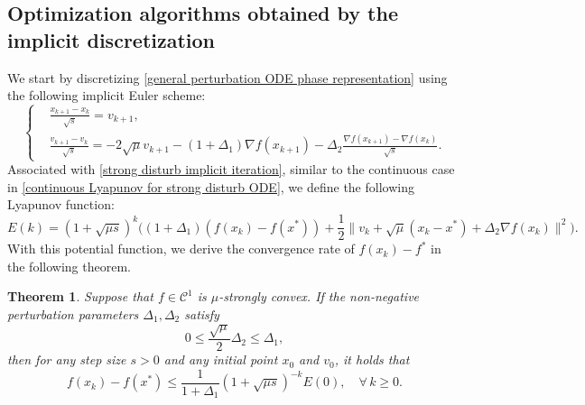 \documentclass[11pt]{article}
\newcommand{\1}{\mathbf 1}
\numberwithin{equation}{section}
\newtheorem{THM}{Theorem}
\begin{document}
\subsection{Optimization algorithms obtained by the implicit discretization}
\label{subsec: implicit discretization}
We start by discretizing \eqref{general perturbation ODE phase representation} 
using the following implicit Euler scheme:
\begin{equation}
    \label{strong disturb implicit iteration}
    \left\{
    \begin{aligned}
        &\frac{x_{k+1}-x_k}{\sqrt{s}}=v_{k+1},\\
        &\frac{v_{k+1}-v_k}{\sqrt{s}}=-2\sqrt{\mu}v_{k+1}-(1+\Delta_1)\nabla f(x_{k+1})-\Delta_2\frac{\nabla f(x_{k+1})-\nabla f(x_k)}{\sqrt{s}}.
    \end{aligned}
    \right.
\end{equation} 
Associated with  \eqref{strong disturb implicit iteration}, similar to the continuous case in \eqref{continuous Lyapunov for strong disturb ODE}, we define the following Lyapunov function:
\begin{equation}
    \label{Lyapunov for strong disturb implicit iteration}
    E(k)=(1+\sqrt{\mu s})^k\big((1+\Delta_1)(f(x_k)-f(x^*))+\frac{1}{2}\|v_{k}+\sqrt{\mu}(x_k-x^*)+\Delta_2\nabla f(x_k)\|^2\big).
\end{equation}
With this potential function, we derive the convergence rate of $f(x_k) - f^*$ in the following theorem. 
\begin{THM}
\label{general implicit corollary}
Suppose that $f\in {\mathcal C}^1$ is  $\mu$-strongly convex.
If the non-negative perturbation parameters $\Delta_1, \Delta_2$ satisfy
\begin{equation}
    \label{condition for implicit}
    0\leqslant \frac{\sqrt{\mu}}{2}\Delta_2\leqslant \Delta_1,
\end{equation}
then for any step size $s>0$ and any initial point $x_0$ and $v_0$,  
it holds that
\begin{equation}\label{eq:rate_con_simp}
    f(x_k)-f(x^*)\leqslant \frac{1}{1+\Delta_1}(1+\sqrt{\mu s})^{-k}E(0), \quad \forall\, k \geqslant 0.
\end{equation}
\end{THM}
\end{document}
